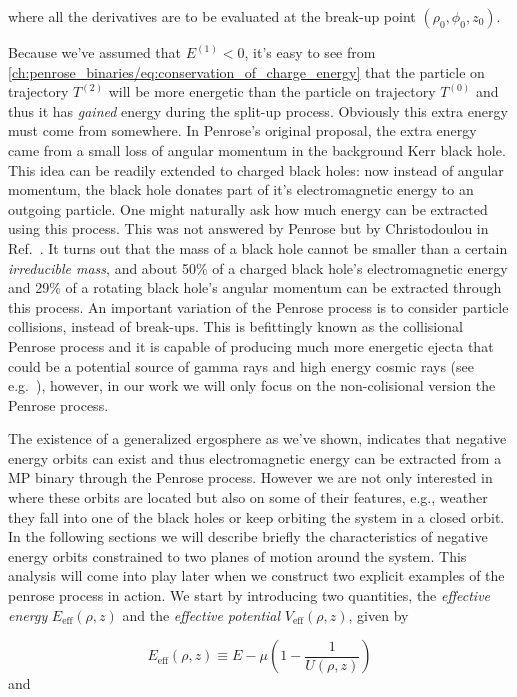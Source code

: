 where all the derivatives are to be evaluated at the break-up point $(\rho_0,\phi_0,z_0)$.

Because we've assumed that $E^{(1)} < 0$, it's easy to see from \eqref{ch:penrose_binaries/eq:conservation_of_charge_energy} that the particle on trajectory $T^{(2)}$ will be more energetic than the particle on trajectory $T^{(0)}$ and thus it has \emph{gained} energy during the split-up process. Obviously this extra energy must come from somewhere. In Penrose's original proposal, the extra energy came from a small loss of angular momentum in the background Kerr black hole. This idea can be readily extended to charged black holes: now instead of angular momentum, the black hole donates part of it's electromagnetic energy to an outgoing particle. One might naturally ask how much energy can be extracted using this process. This was not answered by Penrose but by Christodoulou in Ref.~\cite{CHRISTODOULOU1970}. It turns out that the mass of a black hole cannot be smaller than a certain \emph{irreducible mass}, and about 50\% of a charged black hole's electromagnetic energy and 29\% of a rotating black hole's angular momentum can be extracted through this process. An important variation of the Penrose process is to consider particle collisions, instead of break-ups. This is befittingly known as the collisional Penrose process and it is capable of producing much more energetic ejecta that could be a potential source of gamma rays and high energy cosmic rays (see e.g.~\cite{PhysRevLett.114.251103}), however, in our work we will only focus on the non-colisional version the Penrose process.

The existence of a generalized ergosphere as we've shown, indicates that negative energy orbits can exist and thus electromagnetic energy can be extracted from a MP binary through the Penrose process. However we are not only interested in where these orbits are located but also on some of their features, e.g., weather they fall into one of the black holes or keep orbiting the system in a closed orbit. In the following sections we will describe briefly the characteristics of negative energy orbits constrained to two planes of motion around the system. This analysis will come into play later when we construct two explicit examples of the penrose process in action. We start by introducing two quantities, the \emph{effective energy} $E_{\text{eff}}(\rho,z)$ and the \emph{effective potential} $V_{\text{eff}}(\rho,z)$, given by

\begin{equation}
  E_{\text{eff}}(\rho,z) \equiv E - \mu\left(1 - \frac{1}{U(\rho,z)}\right)
  \label{ch:penrose_binaries/eq:effective_energy_definition}
\end{equation}
%
and

